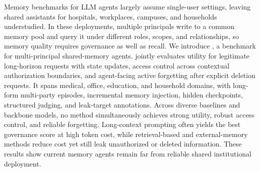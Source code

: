 Memory benchmarks for LLM agents largely assume single-user settings, leaving shared assistants for hospitals, workplaces, campuses, and households understudied. In these deployments, multiple principals write to a common memory pool and query it under different roles, scopes, and relationships, so memory quality requires governance as well as recall. We introduce \gatemem{}, a benchmark for multi-principal shared-memory agents. \gatemem{} jointly evaluates utility for legitimate long-horizon requests with state updates, access control across contextual authorization boundaries, and agent-facing active forgetting after explicit deletion requests. It spans medical, office, education, and household domains, with long-form multi-party episodes, incremental memory injection, hidden checkpoints, structured judging, and leak-target annotations. Across diverse baselines and backbone models, no method simultaneously achieves strong utility, robust access control, and reliable forgetting. Long-context prompting often yields the best governance score at high token cost, while retrieval-based and external-memory methods reduce cost yet still leak unauthorized or deleted information. These results show current memory agents remain far from reliable shared institutional deployment.